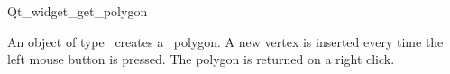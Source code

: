 
\begin{ccRefClass}{Qt_widget_get_polygon}

\ccDefinition
An object of type \ccRefName\ creates a \cgal\ polygon. A new 
vertex is inserted every time the left mouse button is pressed.
The polygon is returned on a right click.


\ccInheritsFrom
{}

\ccGlue

\ccCreation
{}


\end{ccRefClass}









